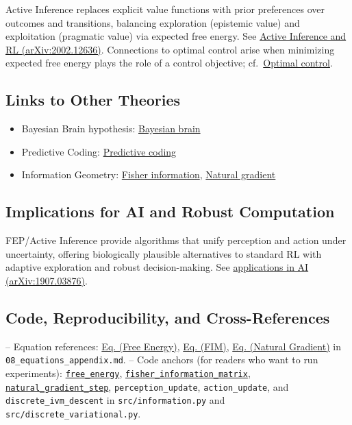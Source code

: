 \documentclass[
]{article}
\providecommand{\tightlist}{%
  \setlength{\itemsep}{0pt}\setlength{\parskip}{0pt}}
\begin{document}
Active Inference replaces explicit value functions with prior
preferences over outcomes and transitions, balancing exploration
(epistemic value) and exploitation (pragmatic value) via expected free
energy. See \href{https://arxiv.org/abs/2002.12636}{Active Inference and
RL (arXiv:2002.12636)}. Connections to optimal control arise when
minimizing expected free energy plays the role of a control objective;
cf.~\href{https://en.wikipedia.org/wiki/Optimal_control}{Optimal
control}.

\hypertarget{links-to-other-theories}{%
\subsection{Links to Other Theories}\label{links-to-other-theories}}

\begin{itemize}
\tightlist
\item
  Bayesian Brain hypothesis:
  \href{https://en.wikipedia.org/wiki/Bayesian_brain}{Bayesian brain}
\item
  Predictive Coding:
  \href{https://en.wikipedia.org/wiki/Predictive_coding}{Predictive
  coding}
\item
  Information Geometry:
  \href{https://en.wikipedia.org/wiki/Fisher_information}{Fisher
  information},
  \href{https://en.wikipedia.org/wiki/Natural_gradient}{Natural
  gradient}
\end{itemize}

\hypertarget{implications-for-ai-and-robust-computation}{%
\subsection{Implications for AI and Robust
Computation}\label{implications-for-ai-and-robust-computation}}

FEP/Active Inference provide algorithms that unify perception and action
under uncertainty, offering biologically plausible alternatives to
standard RL with adaptive exploration and robust decision-making. See
\href{https://arxiv.org/abs/1907.03876}{applications in AI
(arXiv:1907.03876)}.

\hypertarget{code-reproducibility-and-cross-references}{%
\subsection{Code, Reproducibility, and
Cross-References}\label{code-reproducibility-and-cross-references}}

-- Equation references:
\href{08_equations_appendix.md\#eq:free_energy}{Eq. (Free Energy)},
\href{08_equations_appendix.md\#eq:fim}{Eq. (FIM)},
\href{08_equations_appendix.md\#eq:natgrad}{Eq. (Natural Gradient)} in
\texttt{08\_equations\_appendix.md}. -- Code anchors (for readers who
want to run experiments):
\href{03_quadray_methods.md\#code:free_energy}{\texttt{free\_energy}},
\href{03_quadray_methods.md\#code:fisher_information_matrix}{\texttt{fisher\_information\_matrix}},
\href{03_quadray_methods.md\#code:natural_gradient_step}{\texttt{natural\_gradient\_step}},
\texttt{perception\_update}, \texttt{action\_update}, and
\texttt{discrete\_ivm\_descent} in \texttt{src/information.py} and
\texttt{src/discrete\_variational.py}.
\end{document}
